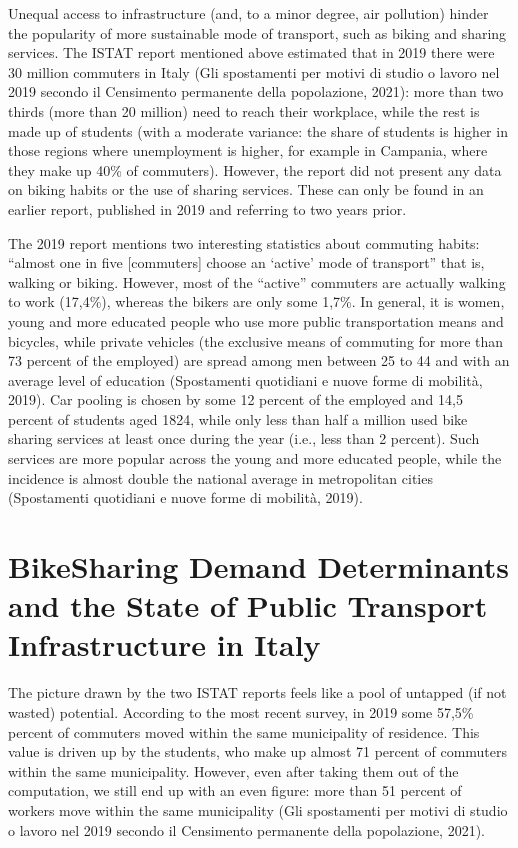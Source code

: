 \documentclass[letterpaper,10pt,english]{jupyterBook}
\begin{document}
\sphinxAtStartPar
Unequal access to infrastructure (and, to a minor degree, air pollution) hinder the popularity of more sustainable mode of transport, such as biking and sharing services. The ISTAT report mentioned above estimated that in 2019 there were 30 million commuters in Italy (Gli spostamenti per motivi di studio o lavoro nel 2019 secondo il Censimento permanente della popolazione, 2021): more than two thirds (more than 20 million) need to reach their workplace, while the rest is made up of students (with a moderate variance: the share of students is higher in those regions where unemployment is higher, for example in Campania, where they make up 40\% of commuters). However, the report did not present any data on biking habits or the use of sharing services. These can only be found in an earlier report, published in 2019 and referring to two years prior.

\sphinxAtStartPar
The 2019 report mentions two interesting statistics about commuting habits: “almost one in five {[}commuters{]} choose an ‘active’ mode of transport” \sphinxhyphen{} that is, walking or biking. However, most of the “active” commuters are actually walking to work (17,4\%), whereas the bikers are only some 1,7\%. In general, it is women, young and more educated people who use more public transportation means and bicycles, while private vehicles (the exclusive means of commuting for more than 73 percent of the employed) are spread among men between 25 to 44 and with an average level of education (Spostamenti quotidiani e nuove forme di mobilità, 2019). Car pooling is chosen by some 12 percent of the employed and 14,5 percent of students aged 18\sphinxhyphen{}24, while only less than half a million used bike sharing services at least once during the year (i.e., less than 2 percent). Such services are more popular across the young and more educated people, while the incidence is almost double the national average in metropolitan cities (Spostamenti quotidiani e nuove forme di mobilità, 2019).


\section{Bike\sphinxhyphen{}Sharing Demand Determinants and the State of Public Transport Infrastructure in Italy}
\label{\detokenize{01-introduction:bike-sharing-demand-determinants-and-the-state-of-public-transport-infrastructure-in-italy}}
\sphinxAtStartPar
The picture drawn by the two ISTAT reports feels like a pool of untapped (if not wasted) potential. According to the most recent survey, in 2019 some 57,5\% percent of commuters moved within the same municipality of residence. This value is driven up by the students, who make up almost 71 percent of commuters within the same municipality. However, even after taking them out of the computation, we still end up with an even figure: more than 51 percent of workers move within the same municipality (Gli spostamenti per motivi di studio o lavoro nel 2019 secondo il Censimento permanente della popolazione, 2021).
\end{document}
